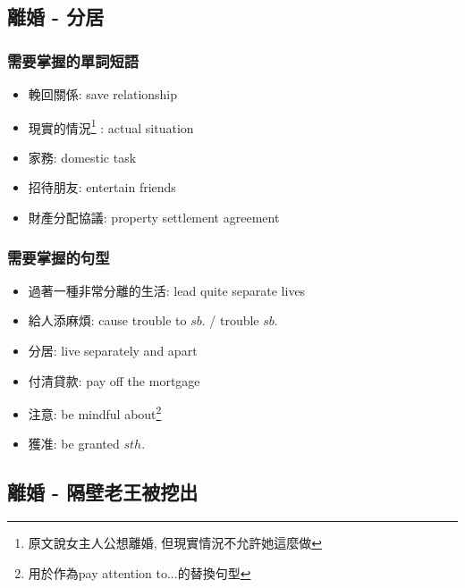 \subsection{離婚 - 分居}
\subsubsection*{需要掌握的單詞短語}
\begin{multicols}{2}
\begin{itemize}
  \itemsep0em
  \item 輓回關係: save relationship
  \item 現實的情況\footnote{原文說女主人公想離婚, 但現實情況不允許她這麼做} : actual situation
  \item 家務: domestic task
  \item 招待朋友: entertain friends
  \item 財產分配協議: property settlement agreement
\end{itemize}
\end{multicols}

\subsubsection*{需要掌握的句型}
\begin{multicols}{2}
\begin{itemize}
  \itemsep0em
  \item 過著一種非常分離的生活: lead quite separate lives
  \item 給人添麻煩: cause trouble to $sb.$ / trouble $sb.$
  \item 分居: live separately and apart
  \item 付清貸款: pay off the mortgage
  \item 注意: be mindful about\footnote{用於作為pay attention to...的替換句型}
  \item 獲准: be granted $sth.$
\end{itemize}
\end{multicols}

\subsection{離婚 - 隔壁老王被挖出}
